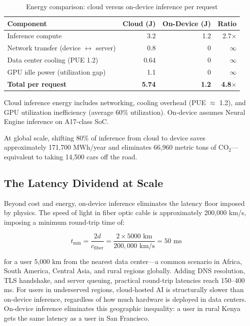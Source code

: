 \documentclass[12pt, letterpaper, twoside]{report}
\begin{document}
\begin{table}[H]
\centering
\caption{Energy comparison: cloud versus on-device inference per request}
\label{tab:energy_comparison}
{\small
\begin{tabular}{@{}lrrr@{}}
\toprule
\textbf{Component} & \textbf{Cloud (J)} & \textbf{On-Device (J)} & \textbf{Ratio} \\
\midrule
Inference compute & 3.2 & 1.2 & 2.7$\times$ \\
Network transfer (device $\leftrightarrow$ server) & 0.8 & 0 & $\infty$ \\
Data center cooling (PUE 1.2) & 0.64 & 0 & $\infty$ \\
GPU idle power (utilization gap) & 1.1 & 0 & $\infty$ \\
\midrule
\textbf{Total per request} & \textbf{5.74} & \textbf{1.2} & \textbf{4.8$\times$} \\
\bottomrule
\end{tabular}
}
\vspace{4pt}
{\scriptsize Cloud inference energy includes networking, cooling overhead (PUE $\approx$ 1.2), and GPU utilization inefficiency (average 60\% utilization). On-device assumes Neural Engine inference on A17-class SoC.}
\end{table}

At global scale, shifting 80\% of inference from cloud to device saves approximately 171,700 MWh/year and eliminates 66,960 metric tons of CO$_2$---equivalent to taking 14,500 cars off the road.

\subsection{The Latency Dividend at Scale}

Beyond cost and energy, on-device inference eliminates the latency floor imposed by physics. The speed of light in fiber optic cable is approximately 200,000 km/s, imposing a minimum round-trip time of:

\begin{equation}
t_{\text{min}} = \frac{2d}{c_{\text{fiber}}} = \frac{2 \times 5000\text{ km}}{200{,}000\text{ km/s}} = 50\text{ ms}
\end{equation}

for a user 5,000 km from the nearest data center---a common scenario in Africa, South America, Central Asia, and rural regions globally. Adding DNS resolution, TLS handshake, and server queuing, practical round-trip latencies reach 150--400 ms. For users in underserved regions, cloud-hosted AI is structurally slower than on-device inference, regardless of how much hardware is deployed in data centers. On-device inference eliminates this geographic inequality: a user in rural Kenya gets the same latency as a user in San Francisco.
\end{document}
